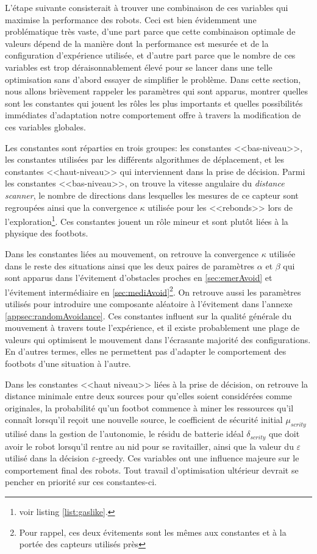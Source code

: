 L'étape suivante consisterait à trouver une combinaison de ces variables qui maximise la performance des robots. Ceci est bien évidemment une problématique très vaste, d'une part parce que cette combinaison optimale de valeurs dépend de la manière dont la performance est mesurée et de la configuration d'expérience utilisée, et d'autre part parce que le nombre de ces variables est trop déraisonnablement élevé pour se lancer dans une telle optimisation sans d'abord essayer de simplifier le problème. Dans cette section, nous allons brièvement rappeler les paramètres qui sont apparus, montrer quelles sont les constantes qui jouent les rôles les plus importants et quelles possibilités immédiates d'adaptation notre comportement offre à travers la modification de ces variables globales.

Les constantes sont réparties en trois groupes: les constantes <<bas-niveau>>, les constantes utilisées par les différents algorithmes de déplacement, et les constantes <<haut-niveau>> qui interviennent dans la prise de décision. Parmi les constantes <<bas-niveau>>, on trouve la vitesse angulaire du \emph{distance scanner}, le nombre de directions dans lesquelles les mesures de ce capteur sont regroupées ainsi que la convergence $\kappa$ utilisée pour les <<rebonds>> lors de l'exploration\footnote{voir listing \ref{list:gaslike}.}. Ces constantes jouent un rôle mineur et sont plutôt liées à la physique des footbots.

Dans les constantes liées au mouvement, on retrouve la convergence $\kappa$ utilisée dans le reste des situations ainsi que les deux paires de paramètres $\alpha$ et $\beta$ qui sont apparus dans l'évitement d'obstacles proches en \ref{sec:emerAvoid} et l'évitement intermédiaire en \ref{sec:mediAvoid}\footnote{Pour rappel, ces deux évitements sont les mêmes aux constantes et à la portée des capteurs utilisés près}. On retrouve aussi les paramètres utilisés pour introduire une composante aléatoire à l'évitement dans l'annexe \ref{appsec:randomAvoidance}. Ces constantes influent sur la qualité générale du mouvement à travers toute l'expérience, et il existe probablement une plage de valeurs qui optimisent le mouvement dans l'écrasante majorité des configurations. En d'autres termes, elles ne permettent pas d'adapter le comportement des footbots d'une situation à l'autre.

Dans les constantes <<haut niveau>> liées à la prise de décision, on retrouve la distance minimale entre deux sources pour qu'elles soient considérées comme originales, la probabilité qu'un footbot commence à miner les ressources qu'il connaît lorsqu'il reçoit une nouvelle source, le coefficient de sécurité initial $\mu_{scrity}$ utilisé dans la gestion de l'autonomie, le résidu de batterie idéal $\delta_{scrity}$ que doit avoir le robot lorsqu'il rentre au nid pour se ravitailler, ainsi que la valeur du $\varepsilon$ utilisé dans la décision $\varepsilon$-greedy. Ces variables ont une influence majeure sur le comportement final des robots. Tout travail d'optimisation ultérieur devrait se pencher en priorité sur ces constantes-ci.

